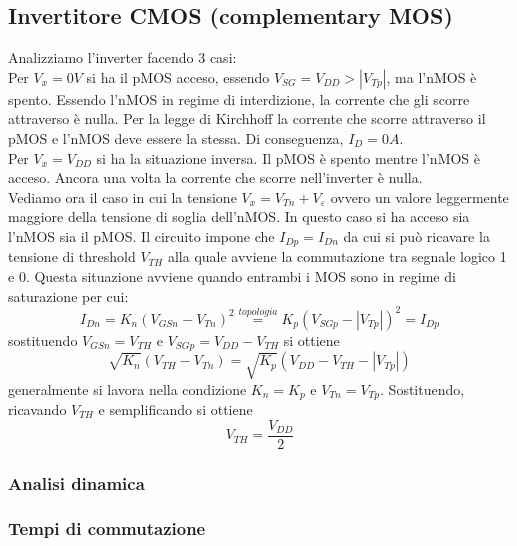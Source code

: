 \documentclass{article}
\begin{document}
\subsection*{Invertitore CMOS (complementary MOS)}
Analizziamo l'inverter facendo 3 casi:\\
Per $V_x = 0V$ si ha il pMOS acceso, essendo $V_{SG} = V_{DD} > |V_{Tp}|$, ma l'nMOS è spento. Essendo l'nMOS in regime di interdizione, la corrente che gli scorre attraverso è nulla. Per la legge di Kirchhoff la corrente che scorre attraverso il pMOS e l'nMOS deve essere la stessa. Di conseguenza, $I_D = 0A$.\\
Per $V_x = V_{DD}$ si ha la situazione inversa. Il pMOS è spento mentre l'nMOS è acceso. Ancora una volta la corrente che scorre nell'inverter è nulla.\\
Vediamo ora il caso in cui la tensione $V_x = V_{Tn} + V_\varepsilon$ ovvero un valore leggermente maggiore della tensione di soglia dell'nMOS. In questo caso si ha acceso sia l'nMOS sia il pMOS. %
Il circuito impone che $I_{Dp} = I_{Dn}$ da cui si può ricavare la tensione di threshold $V_{TH}$ alla quale avviene la commutazione tra segnale logico 1 e 0. Questa situazione avviene quando entrambi i MOS sono in regime di saturazione per cui:
\begin{equation*}
I_{Dn} = K_n (V_{GSn} - V_{Tn})^2 \stackrel{topologia}{=} K_p (V_{SGp} - |V_{Tp}|)^2 = I_{Dp}
\end{equation*}
sostituendo $V_{GSn} = V_{TH}$ e $V_{SGp} = V_{DD} - V_{TH}$ si ottiene
\begin{equation*}
\sqrt{K_n} (V_{TH} - V_{Tn}) = \sqrt{K_p} (V_{DD} - V_{TH} - |V_{Tp}|)
\end{equation*}
generalmente si lavora nella condizione $K_n = K_p$ e $V_{Tn} = V_{Tp}$. Sostituendo, ricavando $V_{TH}$ e semplificando si ottiene
\begin{equation*}
V_{TH} = \frac{V_{DD}}{2}
\end{equation*}

\subsubsection*{Analisi dinamica}
\subsubsection*{Tempi di commutazione}
\end{document}
